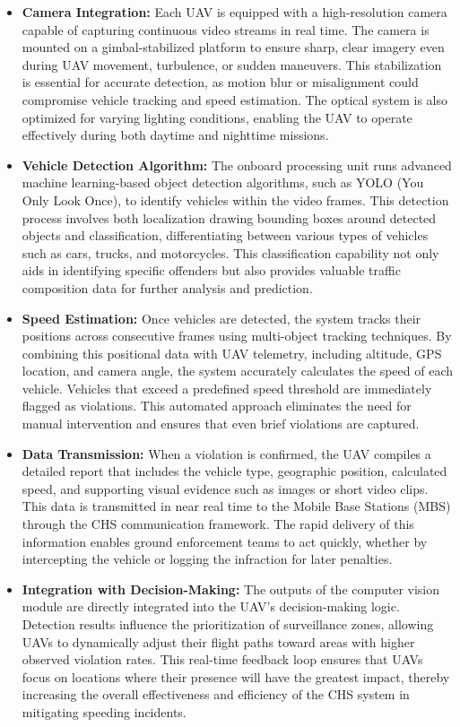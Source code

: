 \begin{itemize}
    \item \textbf{Camera Integration:}  
    Each UAV is equipped with a high-resolution camera capable of capturing continuous video streams in real time. The camera is mounted on a gimbal-stabilized platform to ensure sharp, clear imagery even during UAV movement, turbulence, or sudden maneuvers. This stabilization is essential for accurate detection, as motion blur or misalignment could compromise vehicle tracking and speed estimation. The optical system is also optimized for varying lighting conditions, enabling the UAV to operate effectively during both daytime and nighttime missions.

    \item \textbf{Vehicle Detection Algorithm:}  
    The onboard processing unit runs advanced machine learning-based object detection algorithms, such as YOLO (You Only Look Once), to identify vehicles within the video frames. This detection process involves both localization drawing bounding boxes around detected objects and classification, differentiating between various types of vehicles such as cars, trucks, and motorcycles. This classification capability not only aids in identifying specific offenders but also provides valuable traffic composition data for further analysis and prediction.

    \item \textbf{Speed Estimation:}  
    Once vehicles are detected, the system tracks their positions across consecutive frames using multi-object tracking techniques. By combining this positional data with UAV telemetry, including altitude, GPS location, and camera angle, the system accurately calculates the speed of each vehicle. Vehicles that exceed a predefined speed threshold are immediately flagged as violations. This automated approach eliminates the need for manual intervention and ensures that even brief violations are captured.

    \item \textbf{Data Transmission:}  
    When a violation is confirmed, the UAV compiles a detailed report that includes the vehicle type, geographic position, calculated speed, and supporting visual evidence such as images or short video clips. This data is transmitted in near real time to the Mobile Base Stations (MBS) through the CHS communication framework. The rapid delivery of this information enables ground enforcement teams to act quickly, whether by intercepting the vehicle or logging the infraction for later penalties.

    \item \textbf{Integration with Decision-Making:}  
    The outputs of the computer vision module are directly integrated into the UAV’s decision-making logic. Detection results influence the prioritization of surveillance zones, allowing UAVs to dynamically adjust their flight paths toward areas with higher observed violation rates. This real-time feedback loop ensures that UAVs focus on locations where their presence will have the greatest impact, thereby increasing the overall effectiveness and efficiency of the CHS system in mitigating speeding incidents.
\end{itemize}


